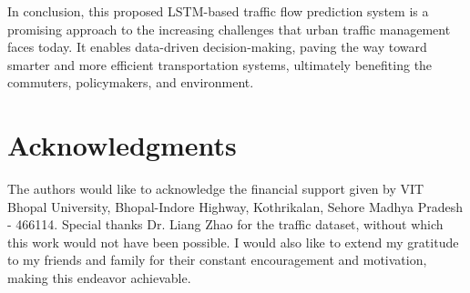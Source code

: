 \documentclass[conference]{IEEEtran}
\begin{document}
In conclusion, this proposed LSTM-based traffic flow prediction system is a promising approach to the increasing challenges that urban traffic management faces today. It enables data-driven decision-making, paving the way toward smarter and more efficient transportation systems, ultimately benefiting the commuters, policymakers, and environment.






\section*{Acknowledgments}

The authors would like to acknowledge the financial support given by VIT Bhopal University, Bhopal-Indore Highway, Kothrikalan, Sehore Madhya Pradesh - 466114. Special thanks Dr.  Liang Zhao\cite{dataset} for the traffic dataset, without which this work would not have been possible. I would also like to extend my gratitude to my friends and family for their constant encouragement and motivation, making this endeavor achievable.
\end{document}
